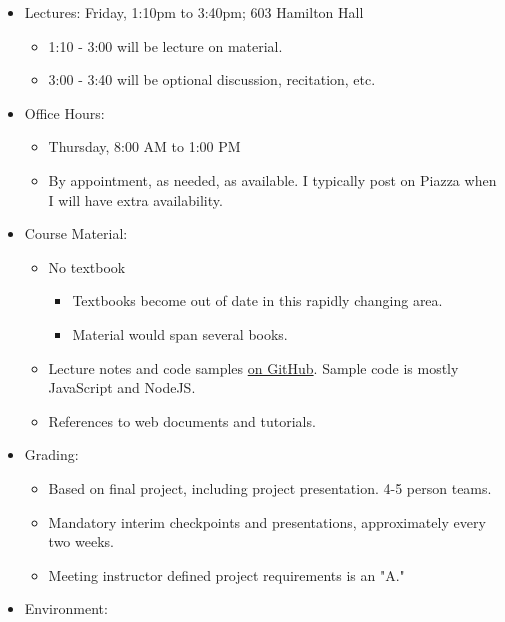 \documentclass[11pt]{article}
\providecommand{\tightlist}{%
      \setlength{\itemsep}{0pt}\setlength{\parskip}{0pt}}
\begin{document}
\begin{itemize}
\tightlist
\item
  Lectures: Friday, 1:10pm to 3:40pm; 603 Hamilton Hall

  \begin{itemize}
  \tightlist
  \item
    1:10 - 3:00 will be lecture on material.
  \item
    3:00 - 3:40 will be optional discussion, recitation, etc.
  \end{itemize}
\item
  Office Hours:

  \begin{itemize}
  \tightlist
  \item
    Thursday, 8:00 AM to 1:00 PM
  \item
    By appointment, as needed, as available. I typically post on Piazza
    when I will have extra availability.
  \end{itemize}
\item
  Course Material:

  \begin{itemize}
  \tightlist
  \item
    No textbook

    \begin{itemize}
    \tightlist
    \item
      Textbooks become out of date in this rapidly changing area.
    \item
      Material would span several books.
    \end{itemize}
  \item
    Lecture notes and code samples
    \href{https://github.com/donald-f-ferguson/E6156f18}{on GitHub}.
    Sample code is mostly JavaScript and NodeJS.
  \item
    References to web documents and tutorials.
  \end{itemize}
\item
  Grading:

  \begin{itemize}
  \tightlist
  \item
    Based on final project, including project presentation. 4-5 person
    teams.
  \item
    Mandatory interim checkpoints and presentations, approximately every
    two weeks.
  \item
    Meeting instructor defined project requirements is an "A."
  \end{itemize}
\item
  Environment:


\end{itemize}
\end{document}
